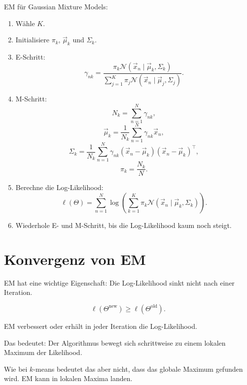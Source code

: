 \begin{definitionbox}
EM für Gaussian Mixture Models:

\begin{enumerate}
    \item Wähle \(K\).
    \item Initialisiere \(\pi_k\), \(\vec{\mu}_k\) und \(\Sigma_k\).
    \item E-Schritt:
    \[
        \gamma_{nk}
        =
        \frac{
            \pi_k
            \mathcal{N}(\vec{x}_n\mid\vec{\mu}_k,\Sigma_k)
        }{
            \sum_{j=1}^{K}
            \pi_j
            \mathcal{N}(\vec{x}_n\mid\vec{\mu}_j,\Sigma_j)
        }.
    \]
    \item M-Schritt:
    \[
        N_k
        =
        \sum_{n=1}^{N}
        \gamma_{nk},
    \]
    \[
        \vec{\mu}_k
        =
        \frac{1}{N_k}
        \sum_{n=1}^{N}
        \gamma_{nk}\vec{x}_n,
    \]
    \[
        \Sigma_k
        =
        \frac{1}{N_k}
        \sum_{n=1}^{N}
        \gamma_{nk}
        (\vec{x}_n-\vec{\mu}_k)
        (\vec{x}_n-\vec{\mu}_k)^{\top},
    \]
    \[
        \pi_k
        =
        \frac{N_k}{N}.
    \]
    \item Berechne die Log-Likelihood:
    \[
        \ell(\Theta)
        =
        \sum_{n=1}^{N}
        \log
        \left(
            \sum_{k=1}^{K}
            \pi_k
            \mathcal{N}(\vec{x}_n\mid\vec{\mu}_k,\Sigma_k)
        \right).
    \]
    \item Wiederhole E- und M-Schritt, bis die Log-Likelihood kaum noch steigt.
\end{enumerate}
\end{definitionbox}

\section{Konvergenz von EM}

EM hat eine wichtige Eigenschaft:
Die Log-Likelihood sinkt nicht nach einer Iteration.

\[
    \ell(\Theta^{\mathrm{new}})
    \geq
    \ell(\Theta^{\mathrm{old}}).
\]

\begin{conceptbox}
EM verbessert oder erhält in jeder Iteration die Log-Likelihood.

Das bedeutet:
Der Algorithmus bewegt sich schrittweise zu einem lokalen Maximum der Likelihood.
\end{conceptbox}

Wie bei \(k\)-means bedeutet das aber nicht, dass das globale Maximum gefunden wird.
EM kann in lokalen Maxima landen.

